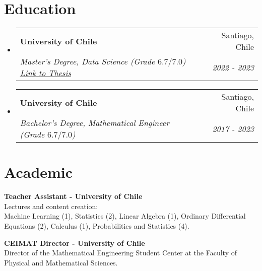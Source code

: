 \documentclass[letterpaper,11pt]{article}
\makeatletter
\newcommand{\resumeItem}[1]{
  \item\small{
    {#1 \vspace{-2pt}}
  }
}
\newcommand{\resumeSubheading}[4]{
  \vspace{-2pt}\item
    \begin{tabular*}{0.97\textwidth}[t]{l@{\extracolsep{\fill}}r}
      \textbf{#1} & #2 \\
      \textit{\small#3} & \textit{\small #4} \\
    \end{tabular*}\vspace{-7pt}
}
\newcommand{\resumeProjectHeading}[2]{
    \item
    \begin{tabular*}{0.97\textwidth}{l@{\extracolsep{\fill}}r}
      \small#1 & #2 \\
    \end{tabular*}\vspace{-7pt}
}
\newcommand{\resumeSubHeadingListStart}{\begin{itemize}[leftmargin=0.15in, label={}]}
\newcommand{\resumeSubHeadingListEnd}{\end{itemize}}
\newcommand{\resumeItemListStart}{\begin{itemize}}
\newcommand{\resumeItemListEnd}{\end{itemize}\vspace{-5pt}}
\makeatother
\begin{document}

\section{Education}
  \resumeSubHeadingListStart
    \resumeSubheading
      {University of Chile}{Santiago, Chile}
      {Master's Degree, Data Science (Grade $6.7/7.0$) \href{https://repositorio.uchile.cl/handle/2250/197408}{\underline{Link to Thesis}}}{2022 - 2023}
    \resumeSubheading
      {University of Chile}{Santiago, Chile}
      {Bachelor's Degree, Mathematical Engineer (Grade $6.7/7.0$)}{2017 - 2023}
  \resumeSubHeadingListEnd


 \section{Academic}
  \begin{itemize}[leftmargin=0.15in, label={}]
  \small{\item{
     \textbf{Teacher Assistant - University of Chile} \\
     Lectures and content creation:\\ Machine Learning (1), Statistics (2), Linear Algebra (1), Ordinary Differential Equations (2), Calculus (1), Probabilities and Statistics (4). \\
    }}
    \small{\item{
     \textbf{CEIMAT Director - University of Chile} \\
     Director of the Mathematical Engineering Student Center at the Faculty of Physical and Mathematical Sciences. 
    }}
 \end{itemize}
\end{document}
